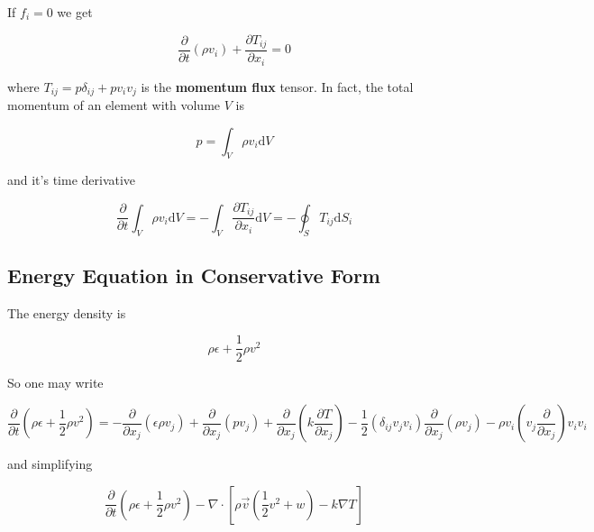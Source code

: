 \documentclass{article}
\begin{document}
If $f_i = 0$ we get

\begin{equation}
  \label{eq:movement_conservative}
  \frac{\partial}{\partial t}\left(\rho v_{i}\right)+\frac{\partial T_{i j}}{\partial x_{i}}=0
\end{equation}

where $T_{ij} = p \delta_{ij} + p v_i v_j$ is the \textbf{momentum flux} tensor.
In fact, the total momentum of an element with volume $V$ is

\begin{equation*}
  p=\int_{V} \rho v_{i} \mathrm{d} V
\end{equation*}

and it's time derivative

\begin{equation*}
  \frac{\partial}{\partial t} \int_{V} \rho v_{i} \mathrm{d} V=-\int_{V} \frac{\partial T_{i j}}{\partial x_{i}} \mathrm{d} V=-\oint_{S} T_{i j} \mathrm{d} S_{i}
\end{equation*}

\subsection{Energy Equation in Conservative Form}

The energy density is

\begin{equation*}
  \rho \epsilon+\frac{1}{2} \rho v^{2}
\end{equation*}

So one may write

\begin{equation*}
  \frac{\partial}{\partial t}\left(\rho \epsilon+\frac{1}{2} \rho v^{2}\right)=-\frac{\partial}{\partial x_{j}}\left(\epsilon \rho v_{j}\right)+\frac{\partial}{\partial x_{j}}\left(p v_{j}\right)+\frac{\partial}{\partial x_{j}}\left(k \frac{\partial T}{\partial x_{j}}\right)-\frac{1}{2}\left(\delta_{i j} v_{j} v_{i}\right) \frac{\partial}{\partial x_{j}}\left(\rho v_{j}\right)-\rho v_{i}\left(v_{j} \frac{\partial}{\partial x_{j}}\right) v_{i} v_{i}
\end{equation*}

and simplifying

\begin{equation}
  \label{eq:energy_conservative}
  \frac{\partial}{\partial t}\left(\rho \epsilon+\frac{1}{2} \rho v^{2}\right)-\nabla \cdot\left[\rho \vec{v}\left(\frac{1}{2} v^{2}+w\right)-k \nabla T\right]
\end{equation}
\end{document}
